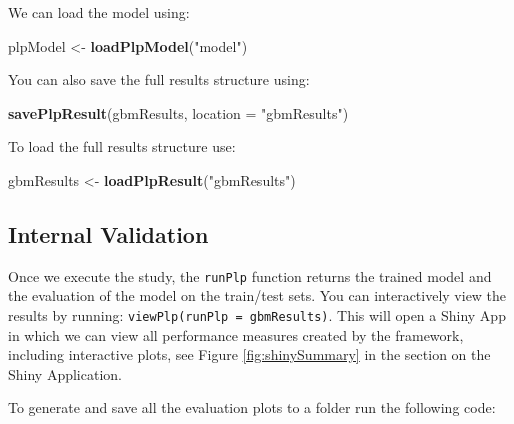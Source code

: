 \documentclass[11pt]{book}
\newenvironment{Shaded}{\begin{snugshade}}{\end{snugshade}}
\newcommand{\DataTypeTok}[1]{\textcolor[rgb]{0.13,0.29,0.53}{#1}}
\newcommand{\KeywordTok}[1]{\textcolor[rgb]{0.13,0.29,0.53}{\textbf{#1}}}
\newcommand{\NormalTok}[1]{#1}
\newcommand{\OperatorTok}[1]{\textcolor[rgb]{0.81,0.36,0.00}{\textbf{#1}}}
\newcommand{\StringTok}[1]{\textcolor[rgb]{0.31,0.60,0.02}{#1}}
\theoremstyle{definition}
\theoremstyle{definition}
\theoremstyle{definition}
\theoremstyle{remark}
\begin{document}
\begin{Shaded}
\end{Shaded}

We can load the model using:

\begin{Shaded}
\begin{Highlighting}[]
\NormalTok{plpModel <-}\StringTok{ }\KeywordTok{loadPlpModel}\NormalTok{(}\StringTok{"model"}\NormalTok{)}
\end{Highlighting}
\end{Shaded}

You can also save the full results structure using:

\begin{Shaded}
\begin{Highlighting}[]
\KeywordTok{savePlpResult}\NormalTok{(gbmResults, }\DataTypeTok{location =} \StringTok{"gbmResults"}\NormalTok{)}
\end{Highlighting}
\end{Shaded}

To load the full results structure use:

\begin{Shaded}
\begin{Highlighting}[]
\NormalTok{gbmResults <-}\StringTok{ }\KeywordTok{loadPlpResult}\NormalTok{(}\StringTok{"gbmResults"}\NormalTok{)}
\end{Highlighting}
\end{Shaded}

\hypertarget{internal-validation}{%
\subsection{Internal Validation}\label{internal-validation}}

Once we execute the study, the \texttt{runPlp} function returns the trained model and the evaluation of the model on the train/test sets. You can interactively view the results by running: \texttt{viewPlp(runPlp\ =\ gbmResults)}. This will open a Shiny App in which we can view all performance measures created by the framework, including interactive plots, see Figure \ref{fig:shinySummary} in the section on the Shiny Application.

To generate and save all the evaluation plots to a folder run the following code:
\end{document}
